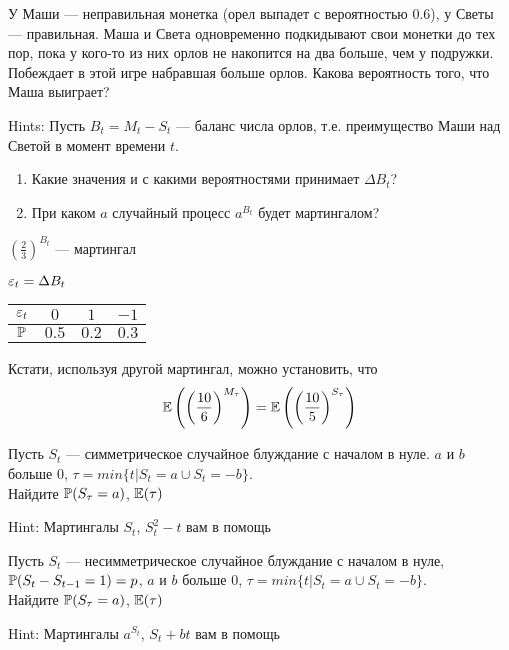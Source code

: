 \begin{problem}
У Маши --- неправильная монетка (орел выпадет с вероятностью 0.6), у Светы --- правильная. Маша и Света одновременно подкидывают свои монетки до тех пор, пока у кого-то из них орлов не накопится на два больше, чем у подружки. Побеждает в этой игре набравшая больше орлов. Какова вероятность того, что Маша выиграет?

Hints: Пусть $B_{t}=M_{t}-S_{t}$ --- баланс числа орлов, т.е. преимущество Маши над Светой в момент времени $t$. 
\begin{enumerate}
\item Какие значения и с какими вероятностями принимает $ \Delta B_{t} $? 
\item При каком $ a $ случайный процесс $ a^{B_{t}} $ будет мартингалом?
\end{enumerate}

\end{problem} 
\begin{solution} 
$ \left(\frac{2}{3}\right)^{B_{t}} $ --- мартингал

$\e_t=\Delta B_t$

\begin{tabular}{cccc}
$\e_t$ & $0$ & $1$ & $-1$ \\ 
\hline 
$\P$ & $0.5$ & $0.2$ & $0.3$ \\ 
\end{tabular} 

Кстати, используя другой мартингал, можно установить, что 
\[
\E\left( \left( \frac{10}{6} \right)^{M_{\tau}} \right) = \E\left( \left( \frac{10}{5} \right)^{S_{\tau}} \right)
\]

\end{solution}

\begin{problem}
Пусть $S_{t}$ --- симметрическое случайное блуждание с началом в нуле. $a$ и $b$ больше 0, $\tau=min\{t|S_{t}=a \cup S_{t}=-b\}$. \\
Найдите $\P(S_{\tau}=a)$, $\E(\tau)$ 
\end{problem} 
\begin{solution} 

Hint: Мартингалы $S_{t}$, $S_{t}^2-t$ вам в помощь 
\end{solution}

\begin{problem}
Пусть $S_{t}$ --- несимметрическое случайное блуждание с началом в нуле, $\P(S_{t}-S_{t-1}=1)=p$, $a$ и $b$ больше 0, $\tau=min\{t|S_{t}=a \cup S_{t}=-b\}$. \\
Найдите $\P(S_{\tau}=a)$, $\E(\tau)$ 
\end{problem} 
\begin{solution} 

Hint: Мартингалы $a^{S_{t}}$, $S_{t}+bt$ вам в помощь 
\end{solution}

